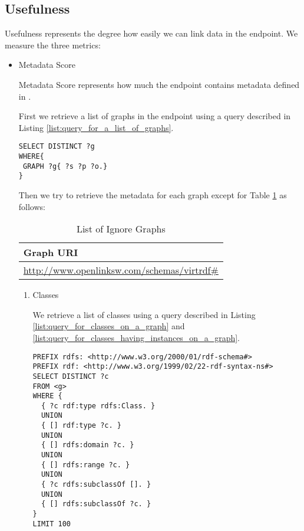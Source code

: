 \documentclass[11pt,a4paper]{article}
\begin{document}
\subsection{Usefulness}

Usefulness represents the degree how easily we can link data in the endpoint.
We measure the three metrics:

\begin{itemize}
  \item Metadata Score

  Metadata Score represents how much the endpoint contains metadata defined in \cite{SparqleBuilderMetadata}.

  First we retrieve a list of graphs in the endpoint using a query described in Listing \ref{list:query_for_a_list_of_graphs}.

  \begin{lstlisting}[basicstyle=\ttfamily\footnotesize,breaklines=true,frame=single,caption=Obtain graph URIs on a SPARQL endpoint,label=list:query_for_a_list_of_graphs]
SELECT DISTINCT ?g
WHERE{
 GRAPH ?g{ ?s ?p ?o.}
}
  \end{lstlisting}

  Then we try to retrieve the metadata for each graph except for Table \ref{table:ignore_graphs} as follows:

  \begin{table}[htbp]
    \center
    \begin{tabular}{|l|}
      \hline
      Graph URI \\
      \hline
      \url{http://www.openlinksw.com/schemas/virtrdf#} \\
      \hline
    \end{tabular}
    \caption{List of Ignore Graphs}
    \label{table:ignore_graphs}
  \end{table}

  \begin{enumerate}

    \item Classes

    We retrieve a list of classes using a query described in Listing \ref{list:query_for_classes_on_a_graph} and \ref{list:query_for_classes_having_instances_on_a_graph}.

    \begin{lstlisting}[basicstyle=\ttfamily\footnotesize,breaklines=true,frame=single,caption=Obtain the classes on a graph g,label=list:query_for_classes_on_a_graph]
PREFIX rdfs: <http://www.w3.org/2000/01/rdf-schema#>
PREFIX rdf: <http://www.w3.org/1999/02/22-rdf-syntax-ns#>
SELECT DISTINCT ?c
FROM <g>
WHERE {
  { ?c rdf:type rdfs:Class. }
  UNION
  { [] rdf:type ?c. }
  UNION
  { [] rdfs:domain ?c. }
  UNION
  { [] rdfs:range ?c. }
  UNION
  { ?c rdfs:subclassOf []. }
  UNION
  { [] rdfs:subclassOf ?c. }
}
LIMIT 100
    \end{lstlisting}


\end{enumerate}
\end{itemize}
\end{document}
